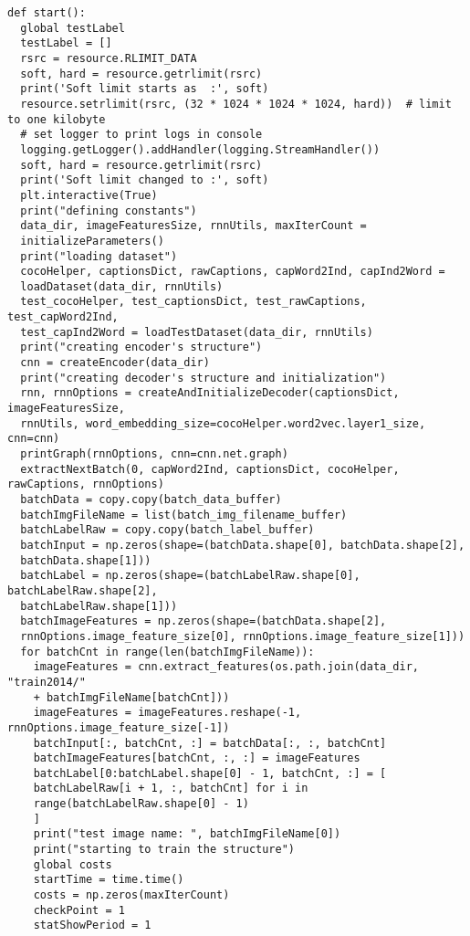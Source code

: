 \begin{latin}
\begin{verbatim}
def start():
  global testLabel
  testLabel = []
  rsrc = resource.RLIMIT_DATA
  soft, hard = resource.getrlimit(rsrc)
  print('Soft limit starts as  :', soft)
  resource.setrlimit(rsrc, (32 * 1024 * 1024 * 1024, hard))  # limit to one kilobyte
  # set logger to print logs in console
  logging.getLogger().addHandler(logging.StreamHandler())  
  soft, hard = resource.getrlimit(rsrc)
  print('Soft limit changed to :', soft)
  plt.interactive(True)
  print("defining constants")
  data_dir, imageFeaturesSize, rnnUtils, maxIterCount = 
  initializeParameters()
  print("loading dataset")
  cocoHelper, captionsDict, rawCaptions, capWord2Ind, capInd2Word = 
  loadDataset(data_dir, rnnUtils)
  test_cocoHelper, test_captionsDict, test_rawCaptions, test_capWord2Ind,
  test_capInd2Word = loadTestDataset(data_dir, rnnUtils)
  print("creating encoder's structure")
  cnn = createEncoder(data_dir)
  print("creating decoder's structure and initialization")
  rnn, rnnOptions = createAndInitializeDecoder(captionsDict, imageFeaturesSize,
  rnnUtils, word_embedding_size=cocoHelper.word2vec.layer1_size, cnn=cnn)
  printGraph(rnnOptions, cnn=cnn.net.graph)
  extractNextBatch(0, capWord2Ind, captionsDict, cocoHelper, rawCaptions, rnnOptions)
  batchData = copy.copy(batch_data_buffer)
  batchImgFileName = list(batch_img_filename_buffer)
  batchLabelRaw = copy.copy(batch_label_buffer)
  batchInput = np.zeros(shape=(batchData.shape[0], batchData.shape[2],
  batchData.shape[1]))
  batchLabel = np.zeros(shape=(batchLabelRaw.shape[0], batchLabelRaw.shape[2], 
  batchLabelRaw.shape[1]))
  batchImageFeatures = np.zeros(shape=(batchData.shape[2], 
  rnnOptions.image_feature_size[0], rnnOptions.image_feature_size[1]))
  for batchCnt in range(len(batchImgFileName)):
    imageFeatures = cnn.extract_features(os.path.join(data_dir, "train2014/" 
    + batchImgFileName[batchCnt]))
    imageFeatures = imageFeatures.reshape(-1, rnnOptions.image_feature_size[-1])
    batchInput[:, batchCnt, :] = batchData[:, :, batchCnt]
    batchImageFeatures[batchCnt, :, :] = imageFeatures
    batchLabel[0:batchLabel.shape[0] - 1, batchCnt, :] = [
    batchLabelRaw[i + 1, :, batchCnt] for i in
    range(batchLabelRaw.shape[0] - 1)
    ]
    print("test image name: ", batchImgFileName[0])
    print("starting to train the structure")
    global costs
    startTime = time.time()
    costs = np.zeros(maxIterCount)
    checkPoint = 1
    statShowPeriod = 1


\end{verbatim}
\end{latin}
